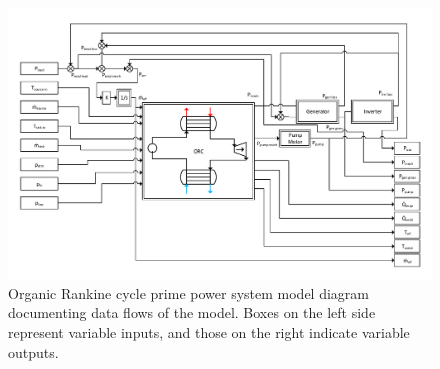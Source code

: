 \begin{figure}[h]
	\centering

	\includegraphics[width=\textwidth]{figures/Full Model Flow Diagram.pdf} 

	\caption{Organic Rankine cycle prime power system model diagram documenting data flows of the model. Boxes on the left side represent variable inputs, and those on the right indicate variable outputs.}
	\label{fig:full_flow_diagram_label}

\end{figure}